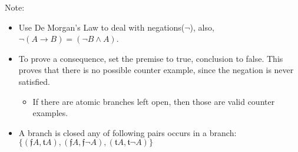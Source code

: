 \documentclass{article}
\newcommand{\true}{{\mathfrak{t}}}
\newcommand{\false}{{\mathfrak{f}}}
\begin{document}
{\large Note: 
\begin{itemize}
    \item Use De Morgan's Law to deal with negations($\lnot$), also, $\lnot (A \rightarrow B) = (\lnot B \wedge A)$.
    \item To prove a consequence, set the premise to true, conclusion to false. This proves that there is
     no possible counter example, since the negation is never satisfied. 
     \begin{itemize}
         \item If there are atomic branches left open, then those are valid counter examples.
     \end{itemize}
    \item A branch is closed any of following pairs occurs in a branch:
    $\{(\false A, \true A), (\false A, \false \lnot A), (\true A, \true \lnot A)\}$
\end{itemize}


}
\end{document}
